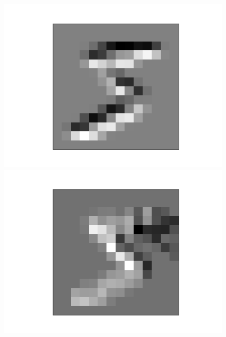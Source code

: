 \documentclass[11pt]{article}
\begin{document}
\begin{figure}[h]
\begin{minipage}{0.2\linewidth}
	\includegraphics[width=\linewidth]{../graphics/mnist_5/conv_pool/upper_horiz_avgpooled.png}
\end{minipage}
\hfill
\begin{minipage}{0.2\linewidth}
	\centering
	\includegraphics[width=\linewidth]{../graphics/mnist_5/conv_pool/left_vert_avgpooled.png}
\end{minipage}
\hfill
\begin{minipage}{0.2\linewidth}
	\centering

\end{minipage}
\end{figure}
\end{document}
